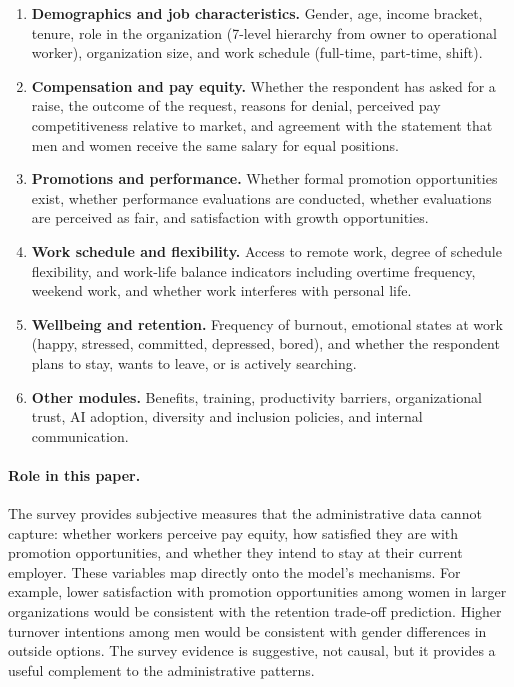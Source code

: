 \documentclass[11pt]{article}
\begin{document}
\begin{enumerate}
\item \textbf{Demographics and job characteristics.} Gender, age, income bracket, tenure, role in the organization (7-level hierarchy from owner to operational worker), organization size, and work schedule (full-time, part-time, shift).

\item \textbf{Compensation and pay equity.} Whether the respondent has asked for a raise, the outcome of the request, reasons for denial, perceived pay competitiveness relative to market, and agreement with the statement that men and women receive the same salary for equal positions.

\item \textbf{Promotions and performance.} Whether formal promotion opportunities exist, whether performance evaluations are conducted, whether evaluations are perceived as fair, and satisfaction with growth opportunities.

\item \textbf{Work schedule and flexibility.} Access to remote work, degree of schedule flexibility, and work-life balance indicators including overtime frequency, weekend work, and whether work interferes with personal life.

\item \textbf{Wellbeing and retention.} Frequency of burnout, emotional states at work (happy, stressed, committed, depressed, bored), and whether the respondent plans to stay, wants to leave, or is actively searching.

\item \textbf{Other modules.} Benefits, training, productivity barriers, organizational trust, AI adoption, diversity and inclusion policies, and internal communication.
\end{enumerate}

\paragraph{Role in this paper.} The survey provides subjective measures that the administrative data cannot capture: whether workers perceive pay equity, how satisfied they are with promotion opportunities, and whether they intend to stay at their current employer. These variables map directly onto the model's mechanisms. For example, lower satisfaction with promotion opportunities among women in larger organizations would be consistent with the retention trade-off prediction. Higher turnover intentions among men would be consistent with gender differences in outside options. The survey evidence is suggestive, not causal, but it provides a useful complement to the administrative patterns.
\end{document}
